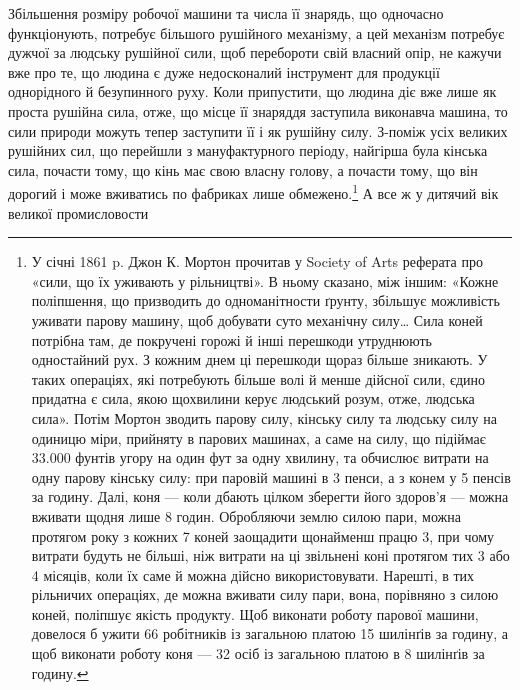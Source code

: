 Збільшення розміру робочої машини та числа її знарядь,
що одночасно функціонують, потребує більшого рушійного механізму,
а цей механізм потребує дужчої за людську рушійної сили,
щоб перебороти свій власний опір, не кажучи вже про те, що
людина є дуже недосконалий інструмент для продукції однорідного
й безупинного руху. Коли припустити, що людина діє
вже лише як проста рушійна сила, отже, що місце її знаряддя
заступила виконавча машина, то сили природи можуть тепер
заступити її і як рушійну силу. З-поміж усіх великих рушійних
сил, що перейшли з мануфактурного періоду, найгірша була
кінська сила, почасти тому, що кінь має свою власну голову,
а почасти тому, що він дорогий і може вживатись по фабриках
лише обмежено.\footnote{
У січні 1861 p. Джон К. Мортон прочитав у Society of Arts реферата
про «сили, що їх уживають у рільництві». В ньому сказано, між
іншим: «Кожне поліпшення, що призводить до одноманітности ґрунту,
збільшує можливість уживати парову машину, щоб добувати суто механічну
силу\dots{} Сила коней потрібна там, де покручені горожі й інші перешкоди
утруднюють одностайний рух. З кожним днем ці перешкоди щораз
більше зникають. У таких операціях, які потребують більше волі й менше
дійсної сили, єдино придатна є сила, якою щохвилини керує людський
розум, отже, людська сила». Потім Мортон зводить парову силу, кінську
силу та людську силу на одиницю міри, прийняту в парових машинах,
а саме на силу, що підіймає 33.000 фунтів угору на один фут за одну хвилину,
та обчислює витрати на одну парову кінську силу: при паровій
машині в 3 пенси, а з конем у 5 пенсів за годину. Далі, коня — коли
дбають цілком зберегти його здоров’я — можна вживати щодня лише
8 годин. Обробляючи землю силою пари, можна протягом року з кожних
7 коней заощадити щонайменш працю 3, при чому витрати будуть не
більші, ніж витрати на ці звільнені коні протягом тих 3 або 4 місяців,
коли їх саме й можна дійсно використовувати. Нарешті, в тих рільничих
операціях, де можна вживати силу пари, вона, порівняно з силою коней,
поліпшує якість продукту. Щоб виконати роботу парової машини, довелося
б ужити 66 робітників із загальною платою 15 шилінґів за годину,
а щоб виконати роботу коня — 32 осіб із загальною платою в 8 шилінґів
за годину.
} А все ж у дитячий вік великої промисловости
\parbreak{}  %
